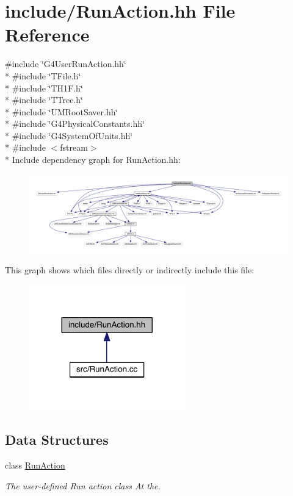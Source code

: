 \hypertarget{RunAction_8hh}{}\section{include/\+Run\+Action.hh File Reference}
\label{RunAction_8hh}
{\ttfamily \#include \char`\"{}G4\+User\+Run\+Action.\+hh\char`\"{}}\\*
{\ttfamily \#include \char`\"{}T\+File.\+h\char`\"{}}\\*
{\ttfamily \#include \char`\"{}T\+H1\+F.\+h\char`\"{}}\\*
{\ttfamily \#include \char`\"{}T\+Tree.\+h\char`\"{}}\\*
{\ttfamily \#include \char`\"{}U\+M\+Root\+Saver.\+hh\char`\"{}}\\*
{\ttfamily \#include \char`\"{}G4\+Physical\+Constants.\+hh\char`\"{}}\\*
{\ttfamily \#include \char`\"{}G4\+System\+Of\+Units.\+hh\char`\"{}}\\*
{\ttfamily \#include $<$fstream$>$}\\*
Include dependency graph for Run\+Action.\+hh\+:
\nopagebreak
\begin{figure}[H]
\begin{center}
\leavevmode
\includegraphics[width=350pt]{RunAction_8hh__incl}
\end{center}
\end{figure}
This graph shows which files directly or indirectly include this file\+:
\nopagebreak
\begin{figure}[H]
\begin{center}
\leavevmode
\includegraphics[width=191pt]{RunAction_8hh__dep__incl}
\end{center}
\end{figure}
\subsection*{Data Structures}
\begin{DoxyCompactItemize}
\item 
class \hyperlink{classRunAction}{Run\+Action}
\begin{DoxyCompactList}\small\item\em The user-\/defined Run action class At the. \end{DoxyCompactList}\end{DoxyCompactItemize}

